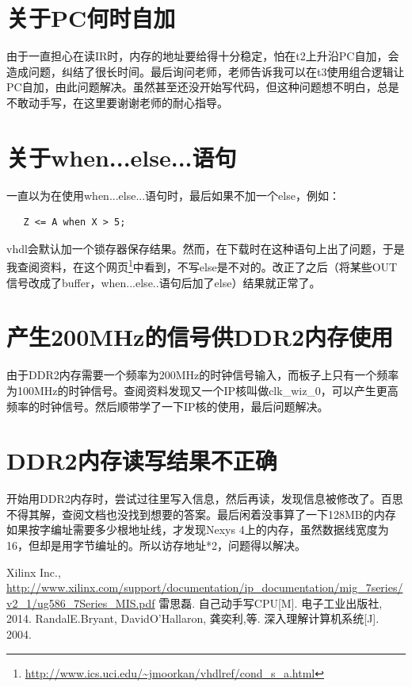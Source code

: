 \documentclass[forprint]{WHUBachelor}
\begin{document}
\section{关于PC何时自加}

由于一直担心在读IR时，内存的地址要给得十分稳定，怕在t2上升沿PC自加，会造成问题，纠结了很长时间。最后询问老师，老师告诉我可以在t3使用组合逻辑让PC自加，由此问题解决。虽然甚至还没开始写代码，但这种问题想不明白，总是不敢动手写，在这里要谢谢老师的耐心指导。

\section{关于when...else...语句}

一直以为在使用when...else...语句时，最后如果不加一个else，例如：

\begin{verbatim}
   Z <= A when X > 5;
\end{verbatim}

vhdl会默认加一个锁存器保存结果。然而，在下载时在这种语句上出了问题，于是我查阅资料，在这个网页\footnote{\url{http://www.ics.uci.edu/~jmoorkan/vhdlref/cond_s_a.html}}中看到，不写else是不对的。改正了之后（将某些OUT信号改成了buffer，when...else..语句后加了else）结果就正常了。

\section{产生200MHz的信号供DDR2内存使用}

由于DDR2内存需要一个频率为200MHz的时钟信号输入，而板子上只有一个频率为100MHz的时钟信号。查阅资料发现又一个IP核叫做clk\_wiz\_0，可以产生更高频率的时钟信号。然后顺带学了一下IP核的使用，最后问题解决。

\section{DDR2内存读写结果不正确}

开始用DDR2内存时，尝试过往里写入信息，然后再读，发现信息被修改了。百思不得其解，查阅文档也没找到想要的答案。最后闲着没事算了一下128MB的内存如果按字编址需要多少根地址线，才发现Nexys 4上的内存，虽然数据线宽度为16，但却是用字节编址的。所以访存地址*2，问题得以解决。

\cleardoublepage{}
{}
\begin{thebibliography}{00}

 Xilinx Inc., \url{http://www.xilinx.com/support/documentation/ip_documentation/mig_7series/v2_1/ug586_7Series_MIS.pdf}
 雷思磊. 自己动手写CPU[M]. 电子工业出版社, 2014.
 RandalE.Bryant, DavidO'Hallaron, 龚奕利,等. 深入理解计算机系统[J]. 2004.

\end{thebibliography}


\cleardoublepage
\end{document}
